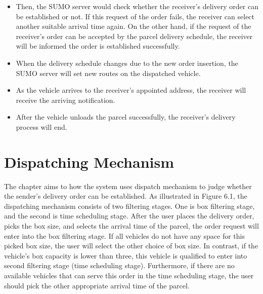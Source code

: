 \documentclass[12pt]{ksthesis}
\begin{document}
\begin{thesis}
{\begin{itemize}
\item
Then, the SUMO server would check whether the receiver’s delivery order can be established or not. If this request of the order fails, the receiver can select another suitable arrival time again. On the other hand, if the request of the receiver’s order can be accepted by the parcel delivery schedule, the receiver will be informed the order is established successfully.


\item
When the delivery schedule changes due to the new order insertion, the SUMO server will set new routes on the dispatched vehicle.

\item
As the vehicle arrives to the receiver’s appointed address, the receiver will receive the arriving notification.

\item
After the vehicle unloads the parcel successfully, the receiver’s delivery process will end.

\end{itemize}


\chapter{Dispatching Mechanism}\label{Chap:Dispatching Mechanism}
The chapter aims to how the system uses dispatch mechanism to judge whether the sender’s delivery order can be established.
As illustrated in Figure 6.1, the dispatching mechanism consists of two filtering stages. One is box filtering stage, and the second is time scheduling stage. After the user places the delivery order, picks the box size, and selects the arrival time of the parcel, the order request will enter into the box filtering stage.
If all vehicles do not have any space for this picked box size, the user will select the other choice of box size. In contrast, if the vehicle’s box capacity is lower than three, this vehicle is qualified to enter into second filtering stage (time scheduling stage). 
Furthermore, if there are no available vehicles that can serve this order in the time scheduling stage, the user should pick the other appropriate arrival time of the parcel.

}
\end{thesis}
\end{document}

